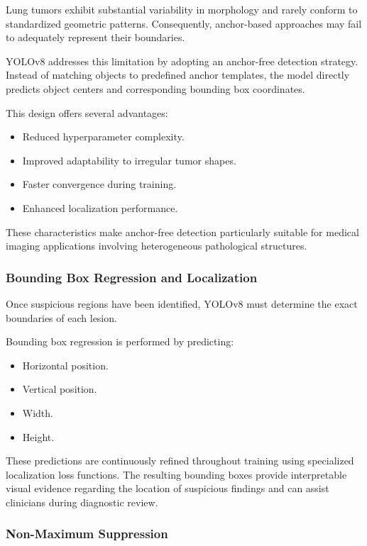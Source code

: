 Lung tumors exhibit substantial variability in morphology and rarely conform to standardized geometric patterns. Consequently, anchor-based approaches may fail to adequately represent their boundaries.

YOLOv8 addresses this limitation by adopting an anchor-free detection strategy. Instead of matching objects to predefined anchor templates, the model directly predicts object centers and corresponding bounding box coordinates.

This design offers several advantages:

\begin{itemize}
	\item Reduced hyperparameter complexity.
	\item Improved adaptability to irregular tumor shapes.
	\item Faster convergence during training.
	\item Enhanced localization performance.
\end{itemize}

These characteristics make anchor-free detection particularly suitable for medical imaging applications involving heterogeneous pathological structures.

\subsubsection{Bounding Box Regression and Localization}

Once suspicious regions have been identified, YOLOv8 must determine the exact boundaries of each lesion.

Bounding box regression is performed by predicting:

\begin{itemize}
	\item Horizontal position.
	\item Vertical position.
	\item Width.
	\item Height.
\end{itemize}

These predictions are continuously refined throughout training using specialized localization loss functions. The resulting bounding boxes provide interpretable visual evidence regarding the location of suspicious findings and can assist clinicians during diagnostic review.

\subsubsection{Non-Maximum Suppression}

